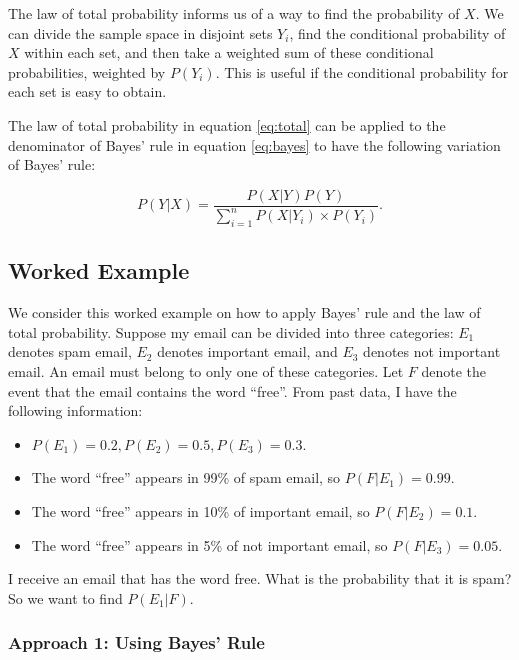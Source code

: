 \documentclass[
]{book}
\providecommand{\tightlist}{%
  \setlength{\itemsep}{0pt}\setlength{\parskip}{0pt}}
\begin{document}
The law of total probability informs us of a way to find the probability of \(X\). We can divide the sample space in disjoint sets \(Y_i\), find the conditional probability of \(X\) within each set, and then take a weighted sum of these conditional probabilities, weighted by \(P(Y_i)\). This is useful if the conditional probability for each set is easy to obtain.

The law of total probability in equation \eqref{eq:total} can be applied to the denominator of Bayes' rule in equation \eqref{eq:bayes} to have the following variation of Bayes' rule:

\begin{equation} 
P(Y|X) = \frac{P(X|Y)P(Y)}{\sum_{i=1}^n P(X|Y_i) \times P(Y_i)}.
\label{eq:bayes2}
\end{equation}

\hypertarget{worked-example}{%
\subsection{Worked Example}\label{worked-example}}

We consider this worked example on how to apply Bayes' rule and the law of total probability. Suppose my email can be divided into three categories: \(E_1\) denotes spam email, \(E_2\) denotes important email, and \(E_3\) denotes not important email. An email must belong to only one of these categories. Let \(F\) denote the event that the email contains the word ``free''. From past data, I have the following information:

\begin{itemize}
\tightlist
\item
  \(P(E_1) = 0.2, P(E_2) = 0.5, P(E_3) = 0.3\).
\item
  The word ``free'' appears in 99\% of spam email, so \(P(F|E_1) = 0.99\).
\item
  The word ``free'' appears in 10\% of important email, so \(P(F|E_2) = 0.1\).
\item
  The word ``free'' appears in 5\% of not important email, so \(P(F|E_3) = 0.05\).
\end{itemize}

I receive an email that has the word free. What is the probability that it is spam? So we want to find \(P(E_1|F)\).

\hypertarget{approach-1-using-bayes-rule}{%
\subsubsection{Approach 1: Using Bayes' Rule}\label{approach-1-using-bayes-rule}}
\end{document}
